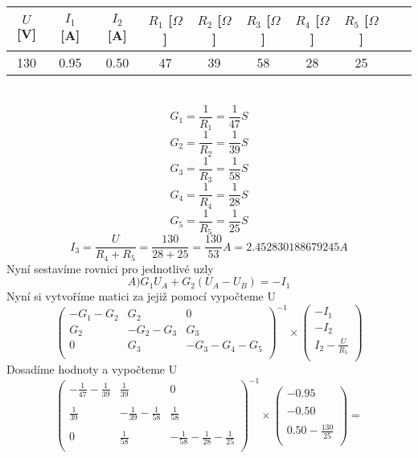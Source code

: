 \documentclass{article}
\begin{document}
\begin{tabular}{| c | c | c | c | c | c | c | c | c | c |}
  \hline
   $U$[V] & $I_1$ [A] & $I_2$ [A]& $R_{1}$ [$\Omega$]& $R_{2}$ [$\Omega$]& $R_{3}$ [$\Omega$]& $R_{4}$ [$\Omega$]& $R_{5}$ [$\Omega$]\\
  \hline
130 & 0.95 & 0.50 & 47 & 39 & 58 & 28 & 25\\
  \hline
\end{tabular}\\
\[
  G_1 = \displaystyle\frac{1}{R_1}
  = \displaystyle\frac{1}{47}S
\]
\[
  G_2 = \displaystyle\frac{1}{R_2}
  = \displaystyle\frac{1}{39}S
\]
\[
  G_3 = \displaystyle\frac{1}{R_3}
  = \displaystyle\frac{1}{58}S
\]
\[
  G_4 = \displaystyle\frac{1}{R_4}
  = \displaystyle\frac{1}{28}S
\]
\[
  G_5 = \displaystyle\frac{1}{R_5}
  = \displaystyle\frac{1}{25}S
\]
\[
  I_3 = \displaystyle\frac{U}{R_4 + R_5}
  = \displaystyle\frac{130}{28 + 25}
  = \displaystyle\frac{130}{53}A
  = 2.452830188679245A
\]
 Nyní sestavíme rovnici pro jednotlivé uzly
 \[
   A)G_1 U_A + G_2 (U_A - U_B ) = -I_1
 \]
 Nyní si vytvoříme matici za jejiž pomocí vypočteme U
\[
  \begin{pmatrix}
    -G_1-G_2 & G_2 & 0\\
    G_2 & -G_2-G_3 & G_3\\
    0 & G_3 & -G_3-G_4-G_5\\
  \end{pmatrix}^{-1}
  \times
  \begin{pmatrix}
    -I_1\\
    -I_2\\
    I_2-\displaystyle\frac{U}{R_5}\\
  \end{pmatrix}
\]
Dosadíme hodnoty a vypočteme U
\[
  \begin{pmatrix}
    -\displaystyle\frac{1}{47} -\displaystyle\frac{1}{39} & \displaystyle\frac{1}{39} & 0\\
    \\
    \displaystyle\frac{1}{39} & -\displaystyle\frac{1}{39}-\displaystyle\frac{1}{58} & \displaystyle\frac{1}{58}\\
    \\
    0 & \displaystyle\frac{1}{58} & -\displaystyle\frac{1}{58}-\displaystyle\frac{1}{28}-\displaystyle\frac{1}{25}\\
  \end{pmatrix}^{-1}

  \times
  \begin{pmatrix}
    -0.95\\
    \\
    -0.50\\
    \\
    0.50-\displaystyle\frac{130}{25}\\
    
  \end{pmatrix}
  =
\]
\end{document}
